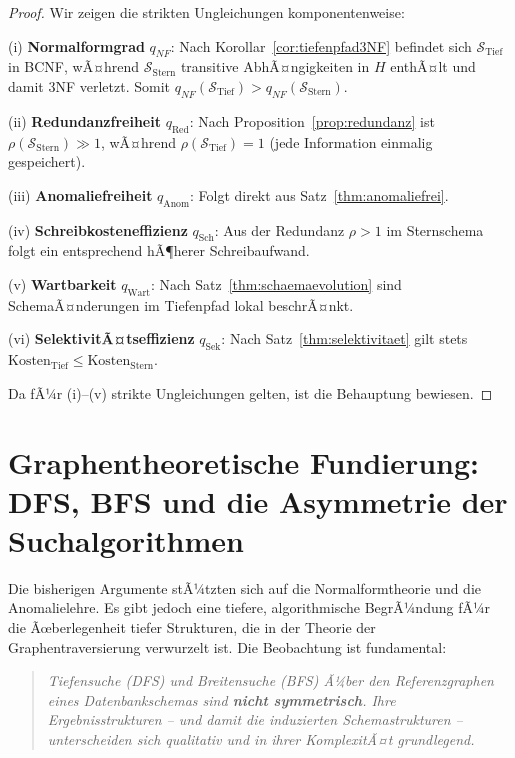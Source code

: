 ﻿\documentclass[a4paper,12pt]{report}
\theoremstyle{definition}
\theoremstyle{remark}
\newcommand{\NF}{\mathit{NF}}
\begin{document}
\begin{proof}
Wir zeigen die strikten Ungleichungen komponentenweise:

\medskip
(i) \textbf{Normalformgrad} $q_{\NF}$: Nach Korollar~\ref{cor:tiefenpfad3NF}
befindet sich $\mathcal{S}_{\text{Tief}}$ in BCNF, wÃ¤hrend
$\mathcal{S}_{\text{Stern}}$ transitive AbhÃ¤ngigkeiten in $H$ enthÃ¤lt
und damit 3NF verletzt. Somit $q_{\NF}(\mathcal{S}_{\text{Tief}}) > q_{\NF}(\mathcal{S}_{\text{Stern}})$.

(ii) \textbf{Redundanzfreiheit} $q_{\text{Red}}$: Nach Proposition~\ref{prop:redundanz}
ist $\rho(\mathcal{S}_{\text{Stern}}) \gg 1$, wÃ¤hrend
$\rho(\mathcal{S}_{\text{Tief}}) = 1$ (jede Information einmalig gespeichert).

(iii) \textbf{Anomaliefreiheit} $q_{\text{Anom}}$: Folgt direkt aus
Satz~\ref{thm:anomaliefrei}.

(iv) \textbf{Schreibkosteneffizienz} $q_{\text{Sch}}$: Aus der Redundanz
$\rho > 1$ im Sternschema folgt ein entsprechend hÃ¶herer Schreibaufwand.

(v) \textbf{Wartbarkeit} $q_{\text{Wart}}$: Nach Satz~\ref{thm:schaemaevolution}
sind SchemaÃ¤nderungen im Tiefenpfad lokal beschrÃ¤nkt.

(vi) \textbf{SelektivitÃ¤tseffizienz} $q_{\text{Sek}}$: Nach
Satz~\ref{thm:selektivitaet} gilt stets
$\text{Kosten}_{\text{Tief}} \leq \text{Kosten}_{\text{Stern}}$.

Da fÃ¼r (i)--(v) strikte Ungleichungen gelten, ist die Behauptung bewiesen.
\end{proof}

\section{Graphentheoretische Fundierung: DFS, BFS und die Asymmetrie der Suchalgorithmen}
\label{sec:dfs_bfs}

Die bisherigen Argumente stÃ¼tzten sich auf die Normalformtheorie und die
Anomalielehre. Es gibt jedoch eine tiefere, algorithmische BegrÃ¼ndung fÃ¼r
die Ãœberlegenheit tiefer Strukturen, die in der Theorie der Graphentraversierung
verwurzelt ist. Die Beobachtung ist fundamental:

\begin{quote}
\emph{Tiefensuche (DFS) und Breitensuche (BFS) Ã¼ber den Referenzgraphen eines
Datenbankschemas sind \textbf{nicht symmetrisch}. Ihre Ergebnisstrukturen --
und damit die induzierten Schemastrukturen -- unterscheiden sich qualitativ
und in ihrer KomplexitÃ¤t grundlegend.}
\end{quote}
\end{document}
